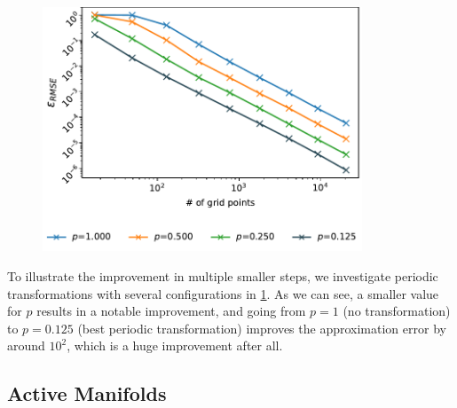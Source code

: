 \documentclass[
  a4paper,  %
  twoside,  %
  bibliography=totoc,
  headsepline,
  cleardoublepage=empty,
  parskip=half,
  draft=false
]{scrbook}
\begin{document}
\begin{mdframed}[style=style]
\vspace{2mm}
\begin{figure}[H]
        \centering
\begin{minipage}{.4\textwidth}
        \centering
    \end{minipage}%
    \begin{minipage}{0.6\textwidth}
        \centering
\includegraphics[width=0.85\textwidth]{graphics/periodic}
    \end{minipage}
\label{fig:periodic}
\end{figure}
\end{mdframed}

To illustrate the improvement in multiple smaller steps, we investigate periodic transformations with several configurations in \cref{fig:periodic}.
As we can see, a smaller value for $p$ results in a notable improvement, and going from $p=1$ (no transformation) to $p=0.125$ (best periodic transformation) improves the approximation error by around $10^2$, which is a huge improvement after all.

\subsection{Active Manifolds}
\end{document}
